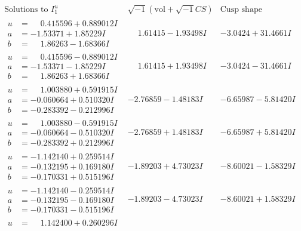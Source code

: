 \documentclass[1p]{elsarticle_modified}
\theoremstyle{definition}
\newcommand{\I}{\sqrt{-1}}
\begin{document}
$$\begin{array}{c|c|c}  
\text{Solutions to }I^u_{1}& \I (\text{vol} + \sqrt{-1}CS) & \text{Cusp shape}\\
 \hline 
\begin{aligned}
u &= \phantom{-}0.415596 + 0.889012 I \\
a &= -1.53371 + 1.85229 I \\
b &= \phantom{-}1.86263 - 1.68366 I\end{aligned}
 & \phantom{-}1.61415 - 1.93498 I & -3.0424 + 31.4661 I \\ \hline\begin{aligned}
u &= \phantom{-}0.415596 - 0.889012 I \\
a &= -1.53371 - 1.85229 I \\
b &= \phantom{-}1.86263 + 1.68366 I\end{aligned}
 & \phantom{-}1.61415 + 1.93498 I & -3.0424 - 31.4661 I \\ \hline\begin{aligned}
u &= \phantom{-}1.003880 + 0.591915 I \\
a &= -0.060664 + 0.510320 I \\
b &= -0.283392 - 0.212996 I\end{aligned}
 & -2.76859 - 1.48183 I & -6.65987 - 5.81420 I \\ \hline\begin{aligned}
u &= \phantom{-}1.003880 - 0.591915 I \\
a &= -0.060664 - 0.510320 I \\
b &= -0.283392 + 0.212996 I\end{aligned}
 & -2.76859 + 1.48183 I & -6.65987 + 5.81420 I \\ \hline\begin{aligned}
u &= -1.142140 + 0.259514 I \\
a &= -0.132195 + 0.169180 I \\
b &= -0.170331 + 0.515196 I\end{aligned}
 & -1.89203 + 4.73023 I & -8.60021 - 1.58329 I \\ \hline\begin{aligned}
u &= -1.142140 - 0.259514 I \\
a &= -0.132195 - 0.169180 I \\
b &= -0.170331 - 0.515196 I\end{aligned}
 & -1.89203 - 4.73023 I & -8.60021 + 1.58329 I \\ \hline\begin{aligned}
u &= \phantom{-}1.142400 + 0.260296 I \\

\end{aligned}
\end{array}$$
\end{document}
